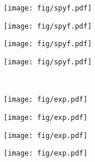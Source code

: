 	\newpage
	
	\begin{figure}[H]
		\centering
		\begin{subfigure}[b]{\fourfig\textwidth} 
			\texttt{[image: fig/spyf.pdf]}
		\end{subfigure}
		\hfil
		\begin{subfigure}[b]{\fourfig\textwidth} 
			\texttt{[image: fig/spyf.pdf]}
		\end{subfigure}
		\hfil
		\begin{subfigure}[b]{\fourfig\textwidth} 
			\texttt{[image: fig/spyf.pdf]}
		\end{subfigure}
		\hfil
		\begin{subfigure}[b]{\fourfig\textwidth} 
			\texttt{[image: fig/spyf.pdf]}
		\end{subfigure}
		\\
				\begin{subfigure}[b]{\fourfig\textwidth} 
			\texttt{[image: fig/exp.pdf]}
		\end{subfigure}
		\hfil
		\begin{subfigure}[b]{\fourfig\textwidth} 
			\texttt{[image: fig/exp.pdf]}
		\end{subfigure}
		\hfil
		\begin{subfigure}[b]{\fourfig\textwidth} 
				\centering
			\texttt{[image: fig/exp.pdf]}
		\end{subfigure}
		\hfil
		\begin{subfigure}[b]{\fourfig\textwidth} 
			\centering
			\texttt{[image: fig/exp.pdf]}
		\end{subfigure}

\end{figure}
